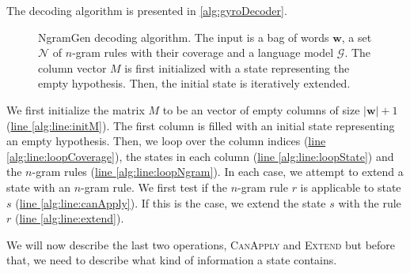 The decoding algorithm is presented in \autoref{alg:gyroDecoder}.
%
\begin{figure}
  \begin{algorithmic}[1]
       \hypertarget{alg:line:initM}{} \label{alg:line:initM}
       \hypertarget{alg:line:loopCoverage}{} \label{alg:line:loopCoverage}
         \hypertarget{alg:line:loopState}{} \label{alg:line:loopState}
           \hypertarget{alg:line:loopNgram}{} \label{alg:line:loopNgram}
             \hypertarget{alg:line:canApply}{} \label{alg:line:canApply}
               \hypertarget{alg:line:extend}{} \label{alg:line:extend}
            \EndIf
          \EndFor
        \EndFor
      \EndFor
    \EndFunction
  \end{algorithmic}
  \caption{NgramGen decoding algorithm. The input is a bag of words $\bm{w}$,
  a set $\mathcal{N}$ of $n$-gram rules with their coverage and a language model
  $\mathcal{G}$. The column vector $M$ is first initialized with a state representing
  the empty hypothesis. Then, the initial state is iteratively extended.}
  \label{alg:gyroDecoder}
\end{figure}
%
We first initialize the matrix $M$ to be an vector of empty
columns of size $|\bm{w}| + 1$ (\hyperlink{alg:line:initM}{line \ref{alg:line:initM}}).
The first column is filled with an initial state representing an empty hypothesis.
Then, we loop over the column indices
(\hyperlink{alg:line:initM}{line \ref{alg:line:loopCoverage}}), the states in each
column (\hyperlink{alg:line:loopState}{line \ref{alg:line:loopState}}) and the
$n$-gram rules (\hyperlink{alg:line:loopNgram}{line \ref{alg:line:loopNgram}}).
In each case, we attempt to extend a state with an $n$-gram rule. We first test
if the $n$-gram rule $r$ is applicable to state $s$
(\hyperlink{alg:line:canApply}{line \ref{alg:line:canApply}}). If this
is the case, we extend the state $s$ with the rule $r$
(\hyperlink{alg:line:extend}{line \ref{alg:line:extend}}).

We will now describe the last two operations, \textsc{CanApply}
and \textsc{Extend} but before that, we need to describe what kind
of information a state contains.

